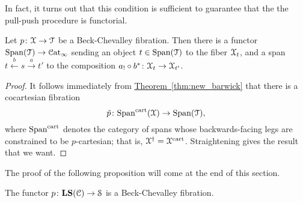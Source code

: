 \documentclass[main.tex]{subfiles}
\begin{document}
In fact, it turns out that this condition is sufficient to guarantee that the the pull-push procedure is functorial.

\begin{proposition}
  Let $p\colon \mathcal{X} \to \mathcal{T}$ be a Beck-Chevalley fibration. Then there is a functor $\mathrm{Span}(\mathcal{T}) \to \mathcal{C}\mathrm{at}_{\infty}$ sending an object $t \in \mathrm{Span}(\mathcal{T})$ to the fiber $\mathcal{X}_{t}$, and a span $t \overset{b}{\leftarrow} s \overset{a}{\rightarrow} t'$ to the composition $a_{!} \circ b^{*}\colon \mathcal{X}_{t} \to \mathcal{X}_{t'}$.
\end{proposition}
\begin{proof}
  It follows immediately from \hyperref[thm:new_barwick]{Theorem~\ref*{thm:new_barwick}} that there is a cocartesian fibration
  \begin{equation*}
    \tilde{p}\colon \mathrm{Span}^{\mathrm{cart}}(\mathcal{X}) \to \mathrm{Span}(\mathcal{T}),
  \end{equation*}
  where $\mathrm{Span}^{\mathrm{cart}}$ denotes the category of spans whose backwards-facing legs are constrained to be $p$-cartesian; that is, $\mathcal{X}^{\dagger} = \mathcal{X}^{\mathrm{cart}}$. Straightening gives the result that we want.
\end{proof}


The proof of the following proposition will come at the end of this section.

\begin{proposition}
  \label{prop:local_systems_are_beck_chevalley}
  The functor $p\colon \mathbf{LS}(\mathcal{C}) \to \mathcal{S}$ is a Beck-Chevalley fibration.
\end{proposition}
\end{document}
